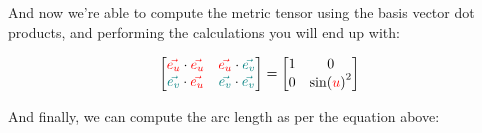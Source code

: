 And now we're able to compute the metric tensor using the basis vector dot products, and 
performing the calculations you will end up with:

\begin{equation}
    \begin{bmatrix}
        \begingroup\color{red}\vec{e_u}\endgroup \cdot \begingroup\color{red}\vec{e_u}\endgroup & \begingroup\color{red}\vec{e_u}\endgroup \cdot \begingroup\color{teal}\vec{e_v}\endgroup\\
        \begingroup\color{teal}\vec{e_v}\endgroup \cdot \begingroup\color{red}\vec{e_u}\endgroup & \begingroup\color{teal}\vec{e_v}\endgroup \cdot \begingroup\color{teal}\vec{e_v}\endgroup
    \end{bmatrix} = 
    \begin{bmatrix}
        1 & 0\\
        0 & \sin(\begingroup\color{red}u\endgroup)^2
    \end{bmatrix}
\end{equation}

And finally, we can compute the arc length as per the equation above:

